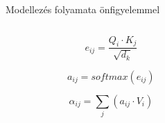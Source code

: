 \documentclass[english, aspectratio=169]{beamer}
\begin{document}
\begin{frame}{Modellezés folyamata önfigyelemmel}
\begin{columns}
\begin{column}{.3\textwidth}
\begin{block}{}
\vspace{-0.1cm}
\[
e_{ij} = \frac{Q_i \cdot K_j}{\sqrt{d_k}} 
\]
\end{block}
\begin{block}{}
\vspace{-0.5cm}
\[
a_{ij} = softmax(e_{ij})
\]
\end{block}
\begin{block}{}
\vspace{-0.3cm}
\[
\alpha_{ij} = \sum_j \left( a_{ij} \cdot V_i \right)
\]
\end{block}
\end{column}
\begin{column}{.7\textwidth}
\end{column}
\end{columns}
\end{frame}
\end{document}
